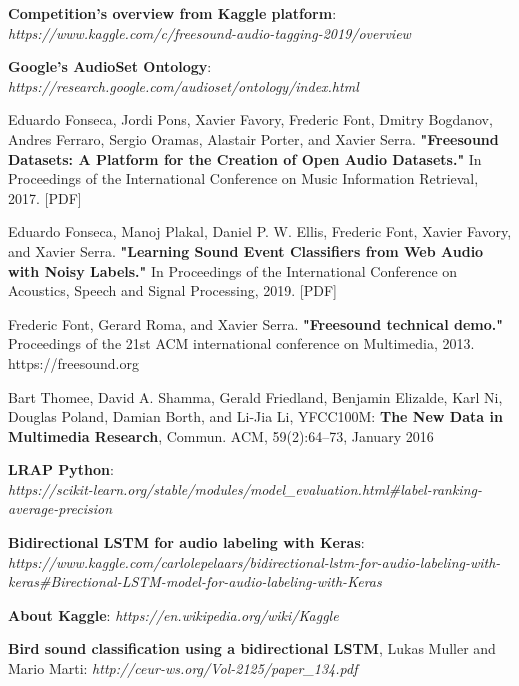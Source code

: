 \documentclass[11pt, a4papper]{report}
\theoremstyle{plain}
\theoremstyle{definition}
\theoremstyle{definition}
\theoremstyle{proposition}
\begin{document}


\begin{thebibliography}{1}
 \textbf{Competition's overview from Kaggle platform}: \\
\textit{https://www.kaggle.com/c/freesound-audio-tagging-2019/overview}

 \textbf{Google’s AudioSet Ontology}: \textit{https://research.google.com/audioset/ontology/index.html}

 Eduardo Fonseca, Jordi Pons, Xavier Favory, Frederic Font, Dmitry Bogdanov, Andres Ferraro, Sergio Oramas, Alastair Porter, and Xavier Serra. \textbf{"Freesound Datasets: A Platform for the Creation of Open Audio Datasets."} In Proceedings of the International Conference on Music Information Retrieval, 2017. [PDF]

 Eduardo Fonseca, Manoj Plakal, Daniel P. W. Ellis, Frederic Font, Xavier Favory, and Xavier Serra. \textbf{"Learning Sound Event Classifiers from Web Audio with Noisy Labels."} In Proceedings of the International Conference on Acoustics, Speech and Signal Processing, 2019. [PDF]

 Frederic Font, Gerard Roma, and Xavier Serra. \textbf{"Freesound technical demo."} Proceedings of the 21st ACM international conference on Multimedia, 2013. https://freesound.org

 Bart Thomee, David A. Shamma, Gerald Friedland, Benjamin Elizalde, Karl Ni, Douglas Poland, Damian Borth, and Li-Jia Li, YFCC100M: \textbf{The New Data in Multimedia Research}, Commun. ACM, 59(2):64–73, January 2016

 \textbf{LRAP Python}: \\
 \textit{https://scikit-learn.org/stable/modules/model\_evaluation.html\#label-ranking-average-precision}
 
 \textbf{Bidirectional LSTM for audio labeling with Keras}: \\
\textit{https://www.kaggle.com/carlolepelaars/bidirectional-lstm-for-audio-labeling-with-keras\#Birectional-LSTM-model-for-audio-labeling-with-Keras}

 \textbf{About Kaggle}: \textit{https://en.wikipedia.org/wiki/Kaggle}

 \textbf{Bird sound classification using a bidirectional LSTM}, Lukas Muller and Mario Marti: \textit{http://ceur-ws.org/Vol-2125/paper\_134.pdf}


\end{thebibliography}
\end{document}
